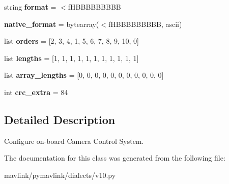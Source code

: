 \begin{DoxyCompactItemize}
\item 
\mbox{\label{classpymavlink_1_1dialects_1_1v10_1_1MAVLink__digicam__configure__message_adbb516e67fb3774f45d77dbd62ad1ee5}} 
string {\bfseries format} = \textquotesingle{}$<$f\+H\+B\+B\+B\+B\+B\+B\+B\+BB\textquotesingle{}
\item 
\mbox{\label{classpymavlink_1_1dialects_1_1v10_1_1MAVLink__digicam__configure__message_a34a17239e62946f05ddd26ab6a5f2db7}} 
{\bfseries native\+\_\+format} = bytearray(\textquotesingle{}$<$f\+H\+B\+B\+B\+B\+B\+B\+B\+BB\textquotesingle{}, \textquotesingle{}ascii\textquotesingle{})
\item 
\mbox{\label{classpymavlink_1_1dialects_1_1v10_1_1MAVLink__digicam__configure__message_a124ec1d9c41b43dfa1b2b64a0e08e1a2}} 
list {\bfseries orders} = \mbox{[}2, 3, 4, 1, 5, 6, 7, 8, 9, 10, 0\mbox{]}
\item 
\mbox{\label{classpymavlink_1_1dialects_1_1v10_1_1MAVLink__digicam__configure__message_aa896b9fffc101612abbe3518e85e523d}} 
list {\bfseries lengths} = \mbox{[}1, 1, 1, 1, 1, 1, 1, 1, 1, 1, 1\mbox{]}
\item 
\mbox{\label{classpymavlink_1_1dialects_1_1v10_1_1MAVLink__digicam__configure__message_a4ec1e2cbf1fc8c90658f7e0c5d12d3cf}} 
list {\bfseries array\+\_\+lengths} = \mbox{[}0, 0, 0, 0, 0, 0, 0, 0, 0, 0, 0\mbox{]}
\item 
\mbox{\label{classpymavlink_1_1dialects_1_1v10_1_1MAVLink__digicam__configure__message_ade58995f7a085855b42291b321386ecd}} 
int {\bfseries crc\+\_\+extra} = 84
\end{DoxyCompactItemize}


\subsection{Detailed Description}
\begin{DoxyVerb}Configure on-board Camera Control System.
\end{DoxyVerb}
 

The documentation for this class was generated from the following file\+:\begin{DoxyCompactItemize}
\item 
mavlink/pymavlink/dialects/v10.\+py\end{DoxyCompactItemize}
